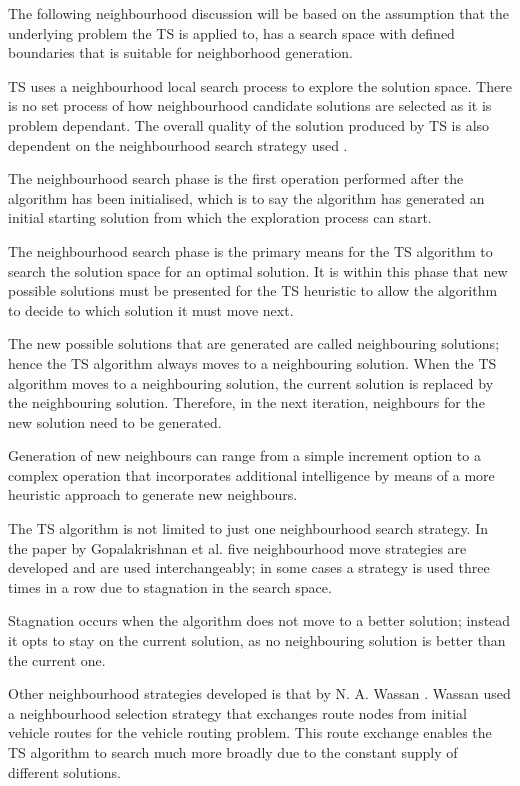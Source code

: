The following neighbourhood discussion will be based on the assumption that the underlying problem the \gls{TS} is applied to, has a search space with defined boundaries that is suitable for neighborhood generation.

TS uses a neighbourhood local search process to explore the solution space. There is no set process of how neighbourhood candidate solutions are selected as it is problem dependant. The overall quality of the solution produced by \gls{TS} is also dependent on the neighbourhood search strategy used \cite{TSHazardous}. 

The neighbourhood search phase is the first operation performed after the algorithm has been initialised, which is to say the algorithm has generated an initial starting solution from which the exploration process can start.

The neighbourhood search phase is the primary means for the \gls{TS} algorithm to search the solution space for an optimal solution. It is within this phase that new possible solutions must be presented for the \gls{TS} heuristic to allow the algorithm to decide to which solution it must move next.

The new possible solutions that are generated are called neighbouring solutions; hence the \gls{TS} algorithm always moves to a neighbouring solution. When the \gls{TS} algorithm moves to a neighbouring solution, the current solution is replaced by the neighbouring solution. Therefore, in the next iteration, neighbours for the new solution need to be generated.

Generation of new neighbours can range from a simple increment option to a complex operation that incorporates additional intelligence by means of a more heuristic approach to generate new neighbours.

The \gls{TS} algorithm is not limited to just one neighbourhood search strategy. In the paper by Gopalakrishnan et al.\cite{TabuCarryOver} five neighbourhood move strategies are developed and are used interchangeably; in some cases a strategy is used three times in a row due to stagnation in the search space. 

Stagnation occurs when the algorithm does not move to a better solution; instead it opts to stay on the current solution, as no neighbouring solution is better than the current one. 

Other neighbourhood strategies developed is that by N. A. Wassan \cite{ReactiveTabuVHR}. Wassan used a neighbourhood selection strategy that exchanges route nodes from initial vehicle routes for the vehicle routing problem. This route exchange enables the \gls{TS} algorithm to search much more broadly due to the constant supply of different solutions. 


